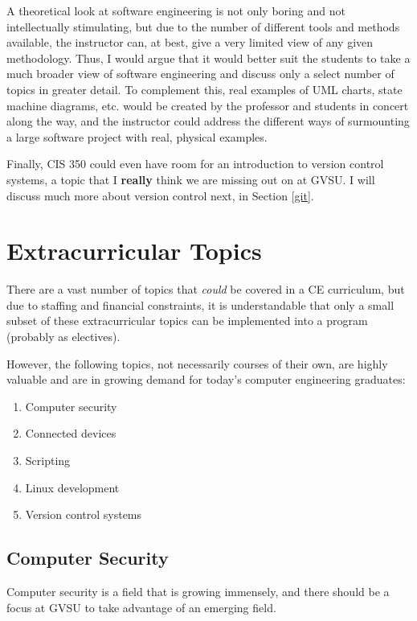 \documentclass[12pt]{article}
\numberwithin{figure}{section}
\numberwithin{equation}{section}
\begin{document}
{\bigskip

A theoretical look at software engineering is not only boring and not
intellectually stimulating, but due to the number of different tools and
methods available, the instructor can, at best, give a very limited view
of any given methodology. Thus, I would argue that it would better suit
the students to take a much broader view of software engineering and
discuss only a select number of topics in greater detail. To complement
this, real examples of UML charts, state machine diagrams, etc. would be
created by the professor and students in concert along the way, and the
instructor could address the different ways of surmounting a large
software project with real, physical examples.

\bigskip

Finally, CIS 350 could even have room for an introduction to version control systems, a topic that I \textbf{really} think we are missing out on at GVSU. I will discuss much more about version control next, in Section \ref{git}.

\newpage
\section{Extracurricular Topics}\label{extracurricular}
There are a vast number of topics that \emph{could} be covered in a CE
curriculum, but due to staffing and financial constraints, it is
understandable that only a small subset of these extracurricular topics
can be implemented into a program (probably as electives).

\bigskip

However, the following topics, not necessarily courses of their own, are
highly valuable and are in growing demand for today's computer
engineering graduates:

\begin{enumerate}
\itemsep1pt\parskip0pt
\item Computer security
\item Connected devices
\item Scripting
\item Linux development
\item Version control systems
\end{enumerate}

\subsection{Computer Security}\label{computer-security}
Computer security is a field that is growing immensely, and there should
be a focus at GVSU to take advantage of an emerging field.

}
\end{document}
